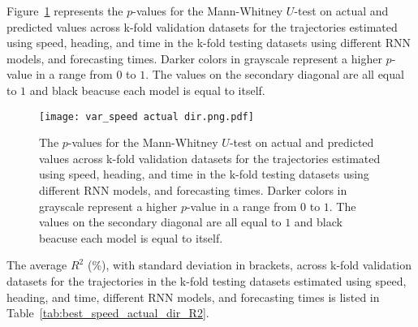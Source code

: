 Figure~\ref{fig:var_speed actual dir.png} represents the $p$-values for the Mann-Whitney $U$-test on actual and predicted values across k-fold validation datasets for the trajectories estimated using speed, heading, and time in the k-fold testing datasets using different RNN models, and forecasting times. Darker colors in grayscale represent a higher $p$-value in a range from $0$ to $1$. The values on the secondary diagonal are all equal to $1$ and black beacuse each model is equal to itself.

\begin{figure}[!ht]
	\centering
	\texttt{[image: var\_speed actual dir.png.pdf]}
	\caption{The $p$-values for the Mann-Whitney $U$-test on actual and predicted values across k-fold validation datasets for the trajectories estimated using speed, heading, and time in the k-fold testing datasets using different RNN models, and forecasting times. Darker colors in grayscale represent a higher $p$-value in a range from $0$ to $1$. The values on the secondary diagonal are all equal to $1$ and black beacuse each model is equal to itself.}
	\label{fig:var_speed actual dir.png}
\end{figure}

The average $R^{2}$ (\%), with standard deviation in brackets, across k-fold validation datasets for the trajectories in the k-fold testing datasets estimated using speed, heading, and time, different RNN models, and forecasting times is listed in Table~\ref{tab:best_speed_actual_dir_R2}.


